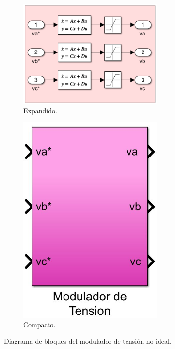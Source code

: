 \documentclass{article}
\begin{document}
\begin{figure}[H]
    \begin{subfigure}[b]{0.75\textwidth}
        \centering
        \includegraphics[width=0.8\textwidth]{5.2.5.e.1.png}
        \caption{Expandido.}
    \end{subfigure}
    \begin{subfigure}[b]{0.24\textwidth}
        \centering
        \includegraphics[width=0.8\textwidth]{modulador_tension_compacto.jpg}
        \caption{Compacto.}
    \end{subfigure}
    \caption{Diagrama de bloques del modulador de tensión no ideal.}
\end{figure}
\end{document}

